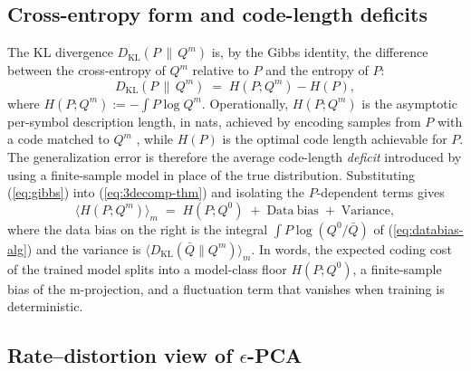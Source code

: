 \documentclass[11pt,a4paper]{article}
\theoremstyle{definition}
\theoremstyle{remark}
\newcommand{\KL}{D_{\mathrm{KL}}}
\newcommand{\PV}{P}
\newcommand{\QVz}{Q^{0}}
\newcommand{\QVm}{Q^{m}}
\newcommand{\QVbar}{\bar{Q}}
\begin{document}
\subsection{Cross-entropy form and code-length deficits}

The KL divergence $\KL(\PV \,\|\, \QVm)$ is, by the Gibbs identity,
the difference between the cross-entropy of $\QVm$ relative to
$\PV$ and the entropy of $\PV$:
\begin{equation}
  \KL(\PV \,\|\, \QVm) \;=\; H(\PV; \QVm) - H(\PV),
  \label{eq:gibbs}
\end{equation}
where $H(\PV; \QVm) := -\int \PV \log \QVm$.
Operationally, $H(\PV; \QVm)$ is the asymptotic per-symbol
description length, in nats, achieved by encoding samples from
$\PV$ with a code matched to $\QVm$
\cite[Chap.~5]{CoverThomas2006}, while $H(\PV)$ is the optimal
code length achievable for $\PV$. The generalization error is
therefore the average code-length \emph{deficit} introduced by
using a finite-sample model in place of the true distribution.
Substituting (\ref{eq:gibbs}) into (\ref{eq:3decomp-thm}) and
isolating the $\PV$-dependent terms gives
\begin{equation}
  \big\langle H(\PV; \QVm)\big\rangle_{m}
  \;=\;
  H(\PV; \QVz)
  \;+\;
  \mathrm{Data\ bias}
  \;+\;
  \mathrm{Variance},
  \label{eq:cross-entropy-decomp}
\end{equation}
where the data bias on the right is the integral
$\int \PV \log(\QVz/\QVbar)$ of (\ref{eq:databias-alg}) and the
variance is $\langle \KL(\QVbar\|\QVm)\rangle_{m}$. In words, the
expected coding cost of the trained model splits into a model-class
floor $H(\PV; \QVz)$, a finite-sample bias of the m-projection,
and a fluctuation term that vanishes when training is deterministic.

\subsection{Rate--distortion view of $\epsilon$-PCA}
\end{document}

